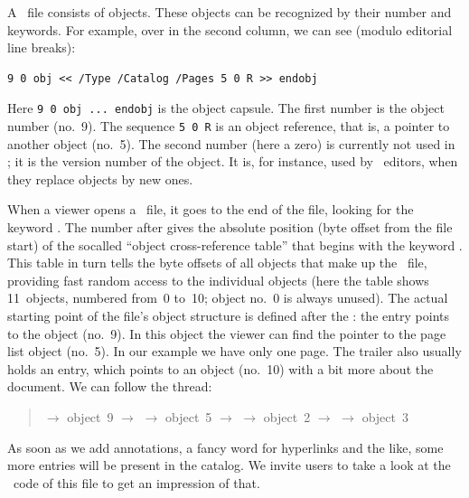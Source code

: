 \documentclass{pdftexmanual}
\begin{document}
A \PDF\ file consists of objects. These objects can be recognized by their
number and keywords. For example, over in the second column, we can see
(modulo editorial line breaks):

\begin{verbatim}
9 0 obj << /Type /Catalog /Pages 5 0 R >> endobj
\end{verbatim}

Here \verb|9 0 obj ... endobj| is the object capsule. The first number
is the object number (no.~9). The sequence \verb|5 0 R| is an object
reference, that is, a pointer to another object (no.~5). The second
number (here a zero) is currently not used in \PDFTEX; it is the version
number of the object. It is, for instance, used by \PDF\ editors, when
they replace objects by new ones.

When a viewer opens a \PDF\ file, it goes to the end of the file,
looking for the keyword . The number after
 gives the absolute position (byte offset from the file
start) of the so\hyph called ``object cross-reference table'' that
begins with the keyword . This table in turn tells the byte
offsets of all objects that make up the \PDF\ file, providing fast
random access to the individual objects (here the  table
shows 11~objects, numbered from~0 to~10; object no.~0 is always unused).
The actual starting point of the file's object structure is defined
after the : the  entry points to the
 object (no.~9). In this object the viewer can find the
pointer  to the page list object (no.~5). In our example we
have only one page. The trailer also usually holds an 
entry, which points to an object (no.~10) with a bit more about the
document. We can follow the thread:

\begin{quote}
     $\longrightarrow$ object~9 $\longrightarrow$
    $\longrightarrow$ object~5 $\longrightarrow$
     $\longrightarrow$ object~2 $\longrightarrow$
 $\longrightarrow$ object~3
\end{quote}

As soon as we add annotations, a fancy word for hyperlinks and the like,
some more entries will be present in the catalog. We invite users to
take a look at the \PDF\ code of this file to get an impression of that.
\end{document}
